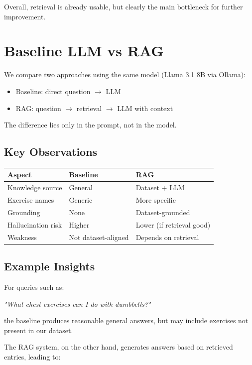 \documentclass[fleqn,moreauthors,10pt]{ds_report}
\begin{document}
Overall, retrieval is already usable, but clearly the main bottleneck for further improvement.

\section*{Baseline LLM vs RAG}

We compare two approaches using the same model (Llama 3.1 8B via Ollama):

\begin{itemize}
\item Baseline: direct question $\rightarrow$ LLM
\item RAG: question $\rightarrow$ retrieval $\rightarrow$ LLM with context
\end{itemize}

The difference lies only in the prompt, not in the model.

\subsection*{Key Observations}

\begin{center}
\begin{tabular}{l l l}
\hline
Aspect & Baseline & RAG \\
\hline
Knowledge source & General & Dataset + LLM \\
Exercise names & Generic & More specific \\
Grounding & None & Dataset-grounded \\
Hallucination risk & Higher & Lower (if retrieval good) \\
Weakness & Not dataset-aligned & Depends on retrieval \\
\hline
\end{tabular}
\end{center}

\subsection*{Example Insights}

For queries such as:

\textit{"What chest exercises can I do with dumbbells?"}

the baseline produces reasonable general answers, but may include exercises not present in our dataset.

The RAG system, on the other hand, generates answers based on retrieved entries, leading to:
\end{document}

